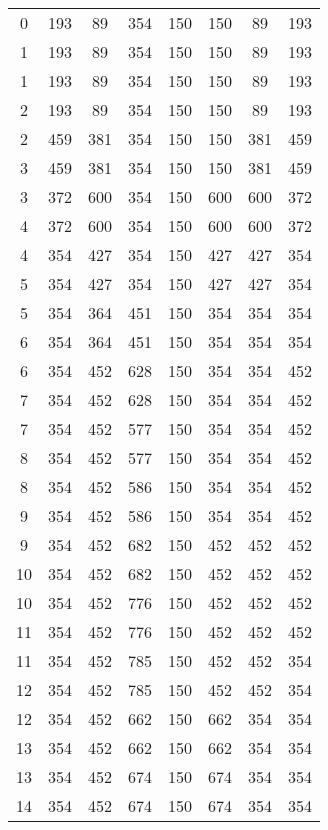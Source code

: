 \begin{longtable}{c|cccc|ccc}
0  & 193  & 89     & 354   & 150   & 150 & 89  & 193 \\
1  & 193  & 89     & 354   & 150   & 150 & 89  & 193 \\
1  & 193  & 89     & 354   & 150   & 150 & 89  & 193 \\
2  & 193  & 89     & 354   & 150   & 150 & 89  & 193 \\
2  & 459  & 381    & 354   & 150   & 150 & 381 & 459 \\
3  & 459  & 381    & 354   & 150   & 150 & 381 & 459 \\
3  & 372  & 600    & 354   & 150   & 600 & 600 & 372 \\
4  & 372  & 600    & 354   & 150   & 600 & 600 & 372 \\
4  & 354  & 427    & 354   & 150   & 427 & 427 & 354 \\
5  & 354  & 427    & 354   & 150   & 427 & 427 & 354 \\
5  & 354  & 364    & 451   & 150   & 354 & 354 & 354 \\
6  & 354  & 364    & 451   & 150   & 354 & 354 & 354 \\
6  & 354  & 452    & 628   & 150   & 354 & 354 & 452 \\
7  & 354  & 452    & 628   & 150   & 354 & 354 & 452 \\
7  & 354  & 452    & 577   & 150   & 354 & 354 & 452 \\
8  & 354  & 452    & 577   & 150   & 354 & 354 & 452 \\
8  & 354  & 452    & 586   & 150   & 354 & 354 & 452 \\
9  & 354  & 452    & 586   & 150   & 354 & 354 & 452 \\
9  & 354  & 452    & 682   & 150   & 452 & 452 & 452 \\
10 & 354  & 452    & 682   & 150   & 452 & 452 & 452 \\
10 & 354  & 452    & 776   & 150   & 452 & 452 & 452 \\
11 & 354  & 452    & 776   & 150   & 452 & 452 & 452 \\
11 & 354  & 452    & 785   & 150   & 452 & 452 & 354 \\
12 & 354  & 452    & 785   & 150   & 452 & 452 & 354 \\
12 & 354  & 452    & 662   & 150   & 662 & 354 & 354 \\
13 & 354  & 452    & 662   & 150   & 662 & 354 & 354 \\
13 & 354  & 452    & 674   & 150   & 674 & 354 & 354 \\
14 & 354  & 452    & 674   & 150   & 674 & 354 & 354 \\

\end{longtable}
